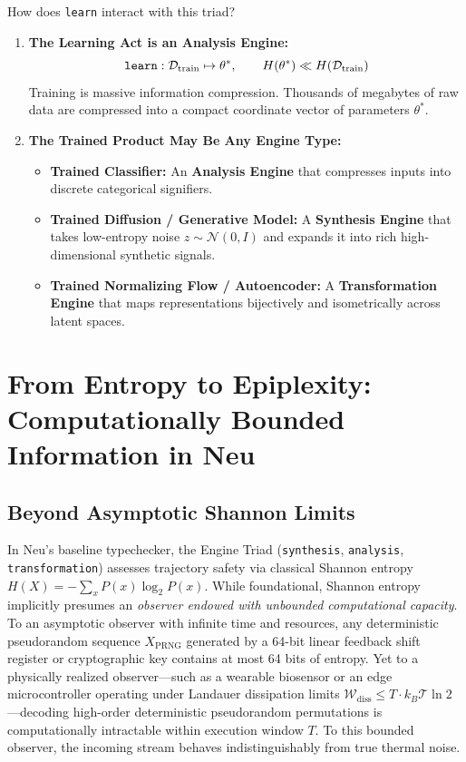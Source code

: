\documentclass[11pt]{article}
\begin{document}
How does \texttt{learn} interact with this triad?
\begin{enumerate}
    \item \textbf{The Learning Act is an Analysis Engine:}
    $$\text{\texttt{learn}}: \mathcal{D}_{\text{train}} \mapsto \theta^*, \qquad H(\theta^*) \ll H(\mathcal{D}_{\text{train}})$$
    Training is massive information compression. Thousands of megabytes of raw data are compressed into a compact coordinate vector of parameters $\theta^*$.
    \item \textbf{The Trained Product May Be Any Engine Type:}
    \begin{itemize}
        \item \textbf{Trained Classifier:} An \textbf{Analysis Engine} that compresses inputs into discrete categorical signifiers.
        \item \textbf{Trained Diffusion / Generative Model:} A \textbf{Synthesis Engine} that takes low-entropy noise $z \sim \mathcal{N}(0, I)$ and expands it into rich high-dimensional synthetic signals.
        \item \textbf{Trained Normalizing Flow / Autoencoder:} A \textbf{Transformation Engine} that maps representations bijectively and isometrically across latent spaces.
    \end{itemize}
\end{enumerate}

\section{From Entropy to Epiplexity: Computationally Bounded Information in Neu}

\subsection{Beyond Asymptotic Shannon Limits}
In Neu's baseline typechecker, the Engine Triad (\texttt{synthesis}, \texttt{analysis}, \texttt{transformation}) assesses trajectory safety via classical Shannon entropy $H(X) = -\sum_{x} P(x) \log_2 P(x)$. While foundational, Shannon entropy implicitly presumes an \emph{observer endowed with unbounded computational capacity}. To an asymptotic observer with infinite time and resources, any deterministic pseudorandom sequence $X_{\text{PRNG}}$ generated by a 64-bit linear feedback shift register or cryptographic key contains at most 64 bits of entropy. Yet to a physically realized observer---such as a wearable biosensor or an edge microcontroller operating under Landauer dissipation limits $\mathcal{W}_{\text{diss}} \le T \cdot k_B \mathcal{T} \ln 2$---decoding high-order deterministic pseudorandom permutations is computationally intractable within execution window $T$. To this bounded observer, the incoming stream behaves indistinguishably from true thermal noise.
\end{document}
